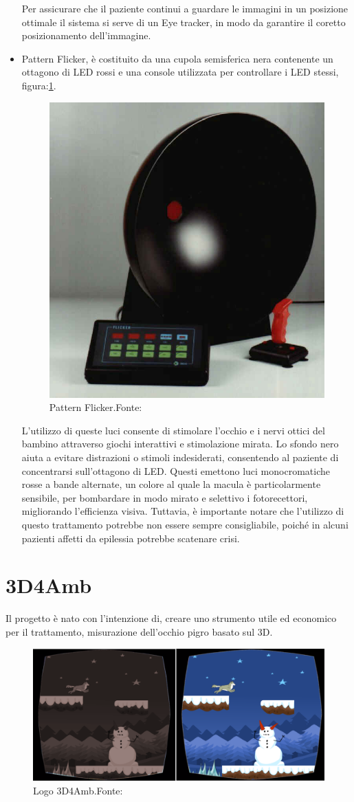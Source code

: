\documentclass[
a4paper,
cleardoublepage=empty,
headings=twolinechapter,
numbers=autoenddot,
]{scrbook}
\begin{document}
\begin{itemize}
	    Per assicurare che il paziente continui a guardare le immagini in un posizione ottimale il sistema si serve di un Eye tracker, in modo da garantire il coretto posizionamento dell'immagine.
	    	\item Pattern Flicker\cite{Pattern-Flicker}, è costituito da una cupola semisferica nera contenente un ottagono di LED rossi e una console utilizzata per controllare i LED stessi, figura:\ref{fig:Pattern-Flicker}.
	    \begin{figure}[h]
	    	\centering
	    	\includegraphics[width=0.5\linewidth]{image/Pattern_Flicker}
	    	\caption{Pattern Flicker.Fonte:\cite{Pattern-Flicker}}
	    	\label{fig:Pattern-Flicker}
	    \end{figure}
    L'utilizzo di queste luci consente di stimolare l'occhio e i nervi ottici del bambino attraverso giochi interattivi e stimolazione mirata. Lo sfondo nero aiuta a evitare distrazioni o stimoli indesiderati, consentendo al paziente di concentrarsi sull'ottagono di LED. Questi emettono luci monocromatiche rosse a bande alternate, un colore al quale la macula è particolarmente sensibile, per bombardare in modo mirato e selettivo i fotorecettori, migliorando l'efficienza visiva. Tuttavia, è importante notare che l'utilizzo di questo trattamento potrebbe non essere sempre consigliabile, poiché in alcuni pazienti affetti da epilessia potrebbe scatenare crisi.
    \end{itemize}

	\chapter{3D4Amb}
	Il progetto è nato con l'intenzione di, creare uno strumento utile ed economico per il trattamento, misurazione dell'occhio pigro basato sul 3D.
	 \begin{figure}[h]
		\centering
		\includegraphics[width=0.8\linewidth]{image/3D4Amb}
		\caption{Logo 3D4Amb.Fonte:\cite{3d4amb}}
		\label{fig:3D4Amb}
	\end{figure}
\end{document}
